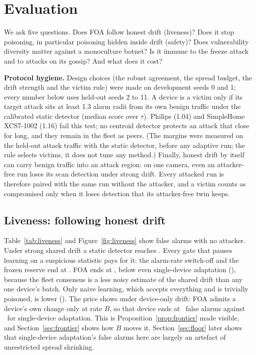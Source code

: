 \section{Evaluation}\label{sec:eval}

We ask five questions. Does FOA follow honest drift (liveness)? Does it stop poisoning, in particular
poisoning hidden inside drift (safety)? Does vulnerability diversity matter against a monoculture
botnet? Is it immune to the freeze attack and to attacks on its gossip? And what does it cost?



\textbf{Protocol hygiene.} Design choices (the robust agreement, the spread budget, the drift strength
and the victim rule) were made on development seeds 0 and 1; every number below uses held-out seeds
2 to 11. A device is a victim only if its target attack sits at least 1.3 alarm radii from its own
benign traffic under the calibrated static detector (median score over $\tau$). Philips (1.04) and
SimpleHome XCS7-1002 (1.16) fail this test; no centroid detector protects an attack that close for
long, and they remain in the fleet as peers. (The margins were measured on the held-out attack traffic
with the static detector, before any adaptive run; the rule selects victims, it does not tune any method.) Finally, honest drift by itself can carry benign traffic
into an attack region: on one camera, even an attacker-free run loses its scan detection under strong
drift. Every attacked run is therefore paired with the same run without the attacker, and a victim
counts as compromised only when it loses detection that its attacker-free twin keeps.

\subsection{Liveness: following honest drift}
Table~\ref{tab:liveness} and Figure~\ref{fig:liveness} show false alarms with no attacker. Under strong
shared drift a static detector reaches \StrongStaticFPR. Every gate that pauses learning on a suspicious
statistic pays for it: the alarm-rate switch-off and the frozen reserve end at \GateFleetFPR. FOA ends at
\FOAFleetFPR, below even single-device adaptation (\AutoFleetFPR), because the fleet consensus is a less
noisy estimate of the shared drift than any one device's batch. Only naive learning, which accepts
everything and is trivially poisoned, is lower (\NaiveFleetFPR). The price shows under device-only
drift: FOA admits a device's own change only at rate $B$, so that device ends at \FOAIdioFPR\ false alarms
against \AutoIdioFPR\ for single-device adaptation. This is Proposition~\ref{prop:frontier} made
visible, and Section~\ref{sec:frontier} shows how $B$ moves it. Section~\ref{sec:floor} later shows that
single-device adaptation's false alarms here are largely an artefact of unrestricted spread shrinking.

